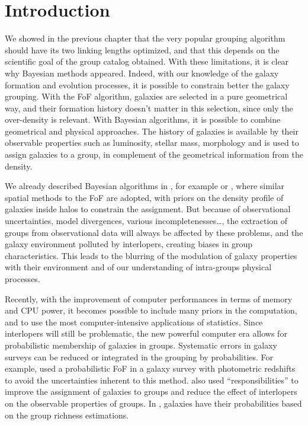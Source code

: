 \section{Introduction}
\label{sec:maggie_introduction}

\newcommand\rvir{r_{\rm vir}}
\newcommand\vvir{v_{\rm vir}}
\newcommand\mvir{M_{\rm vir}}
\newcommand\pps{\emph{pps}}

We showed in the previous chapter that the very popular grouping algorithm
should have its two linking lengths optimized, and that this depends on the
scientific goal of the group catalog obtained. With these limitations, it is
clear why Bayesian methods appeared. Indeed, with our knowledge of the galaxy
formation and evolution processes, it is possible to constrain better the
galaxy grouping. With the FoF algorithm, galaxies are selected in a pure
geometrical way, and their formation history doesn't matter in this selection,
since only the over-density is relevant. With Bayesian algorithms, it is
possible to combine geometrical and physical approaches. The history of
galaxies is available by their observable properties such as luminosity,
stellar mass, morphology and is used to assign galaxies to a group, in
complement of the geometrical information from the density.

We already described Bayesian algorithms in
, for example \citet{Yang+07} or
\citet{DominguezRomero+12}, where similar spatial methods to the FoF are
adopted, with priors on the density profile of galaxies inside halos to
constrain the assignment. But because of observational uncertainties, model
divergences, various incompletenesses\ldots, the extraction of groups from
observational data will always be affected by these problems, and the galaxy
environment polluted by interlopers, creating biases in group characteristics.
This leads to the blurring of the modulation of galaxy properties with their
environment and of our understanding of intra-groups physical processes.

Recently, with the improvement of computer performances in terms of memory and
CPU power, it becomes possible to include many priors in the computation, and
to use the most computer-intensive applications of statistics. Since
interlopers will still be problematic, the new powerful computer era allows for
probabilistic membership of galaxies in groups. Systematic errors in galaxy
surveys can be reduced or integrated in the grouping by probabilities. For
example, \citet{Liu+08} used a probabilistic FoF in a galaxy survey with
photometric redshifts to avoid the uncertainties inherent to this method.
\citet{DominguezRomero+12} also used ``responsibilities'' to improve the
assignment of galaxies to groups and reduce the effect of interlopers on the
observable properties of groups. In \citet{Rykoff+14}, galaxies have their
probabilities based on the group richness estimations.

